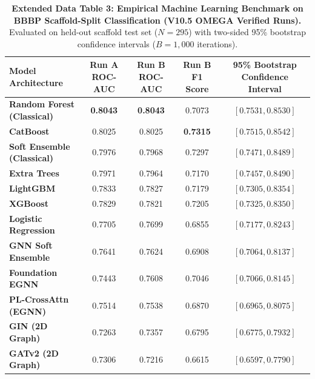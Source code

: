 \begin{table}[h!]
\caption{\textbf{Extended Data Table 3: Empirical Machine Learning Benchmark on BBBP Scaffold-Split Classification (V10.5 OMEGA Verified Runs).} Evaluated on held-out scaffold test set ($N=295$) with two-sided 95\% bootstrap confidence intervals ($B=1,000$ iterations).}
\label{tab:ed_bbbp}
\centering
\small
\begin{tabular}{lcccc}
\toprule
\textbf{Model Architecture} & \textbf{Run A ROC-AUC} & \textbf{Run B ROC-AUC} & \textbf{Run B F1 Score} & \textbf{95\% Bootstrap Confidence Interval} \\
\midrule
\textbf{Random Forest (Classical)} & \textbf{0.8043} & \textbf{0.8043} & 0.7073 & $[0.7531, 0.8530]$ \\
\textbf{CatBoost} & 0.8025 & 0.8025 & \textbf{0.7315} & $[0.7515, 0.8542]$ \\
\textbf{Soft Ensemble (Classical)} & 0.7976 & 0.7968 & 0.7297 & $[0.7471, 0.8489]$ \\
\textbf{Extra Trees} & 0.7971 & 0.7964 & 0.7170 & $[0.7457, 0.8490]$ \\
\textbf{LightGBM} & 0.7833 & 0.7827 & 0.7179 & $[0.7305, 0.8354]$ \\
\textbf{XGBoost} & 0.7829 & 0.7821 & 0.7205 & $[0.7325, 0.8350]$ \\
\textbf{Logistic Regression} & 0.7705 & 0.7699 & 0.6855 & $[0.7177, 0.8243]$ \\
\textbf{GNN Soft Ensemble} & 0.7641 & 0.7624 & 0.6908 & $[0.7064, 0.8137]$ \\
\textbf{Foundation EGNN} & 0.7443 & 0.7608 & 0.7046 & $[0.7066, 0.8145]$ \\
\textbf{PL-CrossAttn (EGNN)} & 0.7514 & 0.7538 & 0.6870 & $[0.6965, 0.8075]$ \\
\textbf{GIN (2D Graph)} & 0.7263 & 0.7357 & 0.6795 & $[0.6775, 0.7932]$ \\
\textbf{GATv2 (2D Graph)} & 0.7306 & 0.7216 & 0.6615 & $[0.6597, 0.7790]$ \\
\bottomrule
\end{tabular}
\end{table}

\vspace{1em}

